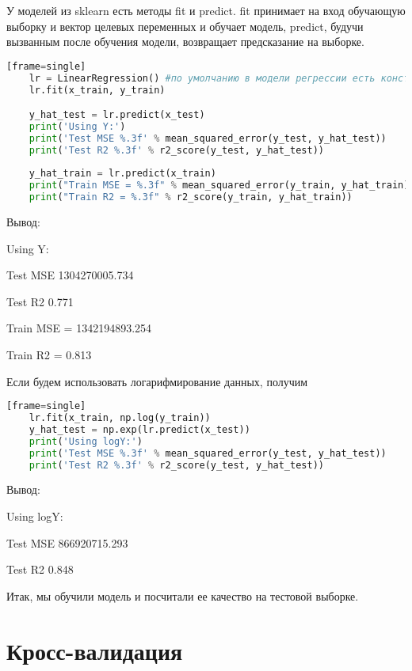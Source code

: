 	У моделей из sklearn есть методы fit и predict. fit принимает на вход обучающую выборку и вектор целевых переменных и обучает модель, predict, будучи вызванным после обучения модели, возвращает предсказание на выборке.

\begin{lstlisting}[language=Python][frame=single]
	lr = LinearRegression() #по умолчанию в модели регрессии есть константа
	lr.fit(x_train, y_train)

	y_hat_test = lr.predict(x_test)
	print('Using Y:')
	print('Test MSE %.3f' % mean_squared_error(y_test, y_hat_test))
	print('Test R2 %.3f' % r2_score(y_test, y_hat_test))
	
	y_hat_train = lr.predict(x_train)
	print("Train MSE = %.3f" % mean_squared_error(y_train, y_hat_train))
	print("Train R2 = %.3f" % r2_score(y_train, y_hat_train)) 
\end{lstlisting}

	Вывод:  
	
	Using Y:
	
	Test MSE 1304270005.734
	
	Test R2 0.771
	
	Train MSE = 1342194893.254
	
	Train R2 = 0.813
	
	Если будем использовать логарифмирование данных, получим

\begin{lstlisting}[language=Python][frame=single]
	lr.fit(x_train, np.log(y_train))
	y_hat_test = np.exp(lr.predict(x_test))
	print('Using logY:')
	print('Test MSE %.3f' % mean_squared_error(y_test, y_hat_test))
	print('Test R2 %.3f' % r2_score(y_test, y_hat_test))
\end{lstlisting}

	Вывод:
	
	Using logY:
	
	Test MSE 866920715.293
	
	Test R2 0.848

	Итак, мы обучили модель и посчитали ее качество на тестовой выборке. 

\section{Кросс-валидация}\label{cha:linreg2/sec:crossvalid}


